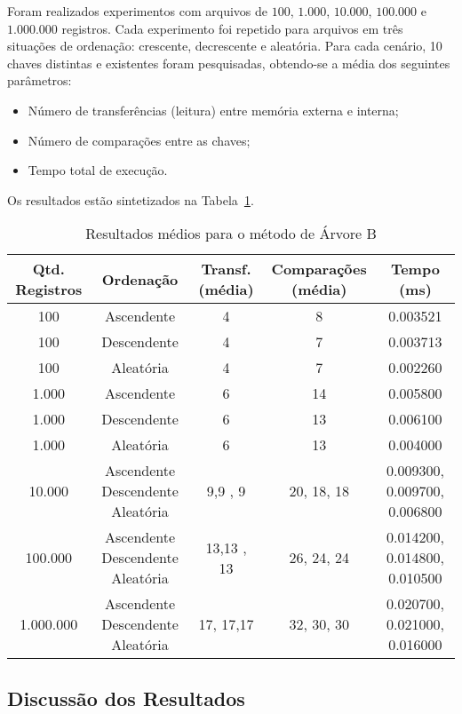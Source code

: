 \documentclass[12pt,a4paper,brazil]{article}
\begin{document}
Foram realizados experimentos com arquivos de $100$, $1.000$, $10.000$, $100.000$ e $1.000.000$ registros. Cada experimento foi repetido para arquivos em três situações de ordenação: crescente, decrescente e aleatória. Para cada cenário, 10 chaves distintas e existentes foram pesquisadas, obtendo-se a média dos seguintes parâmetros:

\begin{itemize}
  \item Número de transferências (leitura) entre memória externa e interna;
  \item Número de comparações entre as chaves;
  \item Tempo total de execução.
\end{itemize}

Os resultados estão sintetizados na Tabela~\ref{tab:arvore-b-resultados}.

\begin{table}[H]
  \centering
  \caption{Resultados médios para o método de Árvore B}
  \label{tab:arvore-b-resultados}
  \begin{tabular}{|c|c|c|c|c|}
    \hline
    \textbf{Qtd. Registros} & \textbf{Ordenação} & \textbf{Transf. (média)} & \textbf{Comparações (média)} & \textbf{Tempo (ms)} \\
    \hline
    100         & Ascendente  & 4	& 8& 0.003521\\
    100         & Descendente & 4	& 7	& 0.003713\\
    100         & Aleatória   & 4	& 7& 0.002260\\
    \hline
    1.000       & Ascendente  & 6& 14& 0.005800
\\
    1.000       & Descendente & 6	& 13	& 0.006100
\\
    1.000       & Aleatória   & 6	& 13& 0.004000\\
    \hline
    10.000      & Ascendente  
Descendente 
Aleatória   & 9,9	, 9	& 20, 18, 18	& 0.009300, 0.009700, 0.006800
\\
    \hline
    100.000     & Ascendente  
Descendente 
Aleatória   & 13,13	, 13	& 26, 24, 24& 0.014200, 0.014800, 0.010500\\
    \hline
    1.000.000   & Ascendente  
Descendente 
Aleatória   & 17, 17,17& 32, 30, 30	 & 0.020700, 0.021000, 0.016000\\
    \hline
  \end{tabular}
\end{table}

\subsection{Discussão dos Resultados}
\end{document}
